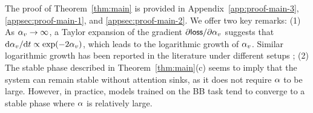 The proof of Theorem~\ref{thm:main} is provided in Appendix~\ref{app:proof-main-3}, \ref{appsec:proof-main-1}, and \ref{appsec:proof-main-2}. We offer two key remarks: (1) As $\alpha_v\to\infty$, a Taylor expansion of the gradient $\partial \mathsf{loss}/\partial \alpha_v$ suggests that $\mathrm{d}\alpha_v/\mathrm{d}t \propto \exp(-2 \alpha_v)$, which leads to the logarithmic growth of $\alpha_v$. Similar logarithmic growth has been reported in the literature under different setups \citep{tian2023scan,zhu2024towards};
(2) The stable phase described in Theorem~\ref{thm:main}(c) seems to imply that the system can remain stable without attention sinks, as it does not require $\alpha$ to be large. However, in practice, models trained on the BB task tend to converge to a stable phase where $\alpha$ is relatively large. 


